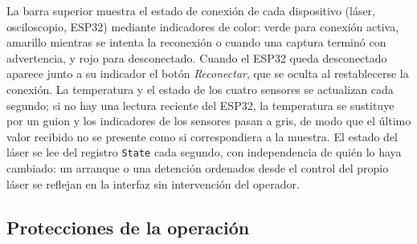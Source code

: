 %
%
%
%

La barra superior muestra el estado de conexión de cada dispositivo
(láser, osciloscopio, ESP32) mediante indicadores de color: verde para
conexión activa, amarillo mientras se intenta la reconexión o cuando
una captura terminó con advertencia, y rojo para desconectado. Cuando
el ESP32 queda desconectado aparece junto a su indicador el botón
\textit{Reconectar}, que se oculta al restablecerse la conexión. La
temperatura y el estado de los cuatro sensores se actualizan cada
segundo; si no hay una lectura reciente del ESP32, la temperatura se
sustituye por un guion y los indicadores de los sensores pasan a gris,
de modo que el último valor recibido no se presente como si
correspondiera a la muestra. El estado del láser se lee del registro
\texttt{State} cada segundo, con independencia de quién lo haya
cambiado: un arranque o una detención ordenados desde el control del
propio láser se reflejan en la interfaz sin intervención del operador.

\subsection{Protecciones de la operación}
\label{sec:protecciones}

